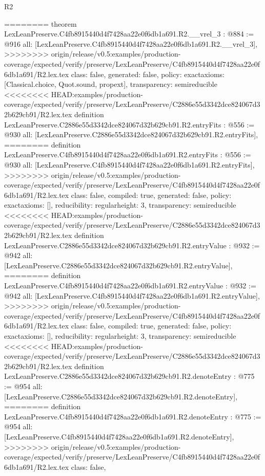 \begin{lexlean}{R2}
\begin{coremodule}
{{{{{{{{{{{{{{{========
theorem LexLeanPreserve.C4fb8915440d4f7428aa22e0f6db1a691.R2.__vrel_3 : @884 := @916 {
  all: [LexLeanPreserve.C4fb8915440d4f7428aa22e0f6db1a691.R2.__vrel_3],
>>>>>>>> origin/release/v0.5:examples/production-coverage/expected/verify/preserve/LexLeanPreserve/C4fb8915440d4f7428aa22e0f6db1a691/R2.lex.tex
  class: false,
  generated: false,
  policy: exact{axioms: [Classical.choice, Quot.sound, propext]},
  transparency: semireducible
}
<<<<<<<< HEAD:examples/production-coverage/expected/verify/preserve/LexLeanPreserve/C2886e55d3342dce824067d32b629cb91/R2.lex.tex
definition LexLeanPreserve.C2886e55d3342dce824067d32b629cb91.R2.entryFits : @556 := @930 {
  all: [LexLeanPreserve.C2886e55d3342dce824067d32b629cb91.R2.entryFits],
========
definition LexLeanPreserve.C4fb8915440d4f7428aa22e0f6db1a691.R2.entryFits : @556 := @930 {
  all: [LexLeanPreserve.C4fb8915440d4f7428aa22e0f6db1a691.R2.entryFits],
>>>>>>>> origin/release/v0.5:examples/production-coverage/expected/verify/preserve/LexLeanPreserve/C4fb8915440d4f7428aa22e0f6db1a691/R2.lex.tex
  class: false,
  compiled: true,
  generated: false,
  policy: exact{axioms: []},
  reducibility: regular{height: 3},
  transparency: semireducible
}
<<<<<<<< HEAD:examples/production-coverage/expected/verify/preserve/LexLeanPreserve/C2886e55d3342dce824067d32b629cb91/R2.lex.tex
definition LexLeanPreserve.C2886e55d3342dce824067d32b629cb91.R2.entryValue : @932 := @942 {
  all: [LexLeanPreserve.C2886e55d3342dce824067d32b629cb91.R2.entryValue],
========
definition LexLeanPreserve.C4fb8915440d4f7428aa22e0f6db1a691.R2.entryValue : @932 := @942 {
  all: [LexLeanPreserve.C4fb8915440d4f7428aa22e0f6db1a691.R2.entryValue],
>>>>>>>> origin/release/v0.5:examples/production-coverage/expected/verify/preserve/LexLeanPreserve/C4fb8915440d4f7428aa22e0f6db1a691/R2.lex.tex
  class: false,
  compiled: true,
  generated: false,
  policy: exact{axioms: []},
  reducibility: regular{height: 3},
  transparency: semireducible
}
<<<<<<<< HEAD:examples/production-coverage/expected/verify/preserve/LexLeanPreserve/C2886e55d3342dce824067d32b629cb91/R2.lex.tex
definition LexLeanPreserve.C2886e55d3342dce824067d32b629cb91.R2.denoteEntry : @775 := @954 {
  all: [LexLeanPreserve.C2886e55d3342dce824067d32b629cb91.R2.denoteEntry],
========
definition LexLeanPreserve.C4fb8915440d4f7428aa22e0f6db1a691.R2.denoteEntry : @775 := @954 {
  all: [LexLeanPreserve.C4fb8915440d4f7428aa22e0f6db1a691.R2.denoteEntry],
>>>>>>>> origin/release/v0.5:examples/production-coverage/expected/verify/preserve/LexLeanPreserve/C4fb8915440d4f7428aa22e0f6db1a691/R2.lex.tex
  class: false,
}}}}}}}}}}}}}}}}}}}
\end{coremodule}
\end{lexlean}
